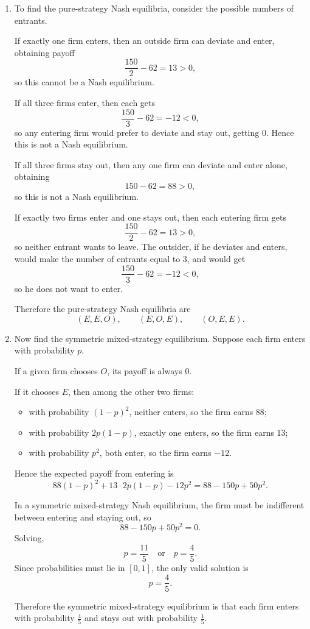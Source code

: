 \documentclass[12pt,a4paper]{article}
\begin{document}
\begin{enumerate}[label=\alph*.]
  \item To find the pure-strategy Nash equilibria, consider the possible numbers of entrants.

  If exactly one firm enters, then an outside firm can deviate and enter, obtaining payoff
  \[
  \frac{150}{2}-62=13>0,
  \]
  so this cannot be a Nash equilibrium.

  If all three firms enter, then each gets
  \[
  \frac{150}{3}-62=-12<0,
  \]
  so any entering firm would prefer to deviate and stay out, getting \(0\). Hence this is not a Nash equilibrium.

  If all three firms stay out, then any one firm can deviate and enter alone, obtaining
  \[
  150-62=88>0,
  \]
  so this is not a Nash equilibrium.

  If exactly two firms enter and one stays out, then each entering firm gets
  \[
  \frac{150}{2}-62=13>0,
  \]
  so neither entrant wants to leave. The outsider, if he deviates and enters, would make the number of entrants equal to \(3\), and would get
  \[
  \frac{150}{3}-62=-12<0,
  \]
  so he does not want to enter.

  Therefore the pure-strategy Nash equilibria are
  \[
  (E,E,O),\qquad (E,O,E),\qquad (O,E,E).
  \]

  \item Now find the symmetric mixed-strategy equilibrium. Suppose each firm enters with probability \(p\).

  If a given firm chooses \(O\), its payoff is always \(0\).

  If it chooses \(E\), then among the other two firms:

  \begin{itemize}
    \item with probability \((1-p)^2\), neither enters, so the firm earns \(88\);
    \item with probability \(2p(1-p)\), exactly one enters, so the firm earns \(13\);
    \item with probability \(p^2\), both enter, so the firm earns \(-12\).
  \end{itemize}
  Hence the expected payoff from entering is
  \[
  88(1-p)^2+13\cdot 2p(1-p)-12p^2=88-150p+50p^2.
  \]

  In a symmetric mixed-strategy Nash equilibrium, the firm must be indifferent between entering and staying out, so
  \[
  88-150p+50p^2=0.
  \]
  Solving,
  \[
  p=\frac{11}{5}\quad\text{or}\quad p=\frac45.
  \]
  Since probabilities must lie in \([0,1]\), the only valid solution is
  \[
  p=\frac45.
  \]

  Therefore the symmetric mixed-strategy equilibrium is that each firm enters with probability \(\frac{4}{5}\) and stays out with probability \(\frac{1}{5}\).
\end{enumerate}
\end{document}
